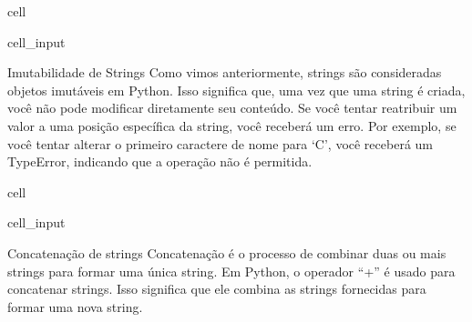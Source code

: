\documentclass[letterpaper,10pt,english]{jupyterBook}
\begin{document}
\begin{sphinxuseclass}{cell}\begin{sphinxVerbatimInput}

\begin{sphinxuseclass}{cell_input}
\begin{sphinxVerbatim}[commandchars=\\\{\}]
\PYG{p}{[}\PYG{p}{]}  
\end{sphinxVerbatim}

\end{sphinxuseclass}\end{sphinxVerbatimInput}

\end{sphinxuseclass}
\sphinxAtStartPar
Imutabilidade de Strings
Como vimos anteriormente, strings são consideradas objetos imutáveis em Python. Isso significa que, uma vez que uma string é criada, você não pode modificar diretamente seu conteúdo. Se você tentar reatribuir um valor a uma posição específica da string, você receberá um erro. Por exemplo, se você tentar alterar o primeiro caractere de nome para ‘C’, você receberá um TypeError, indicando que a operação não é permitida.

\begin{sphinxuseclass}{cell}\begin{sphinxVerbatimInput}

\begin{sphinxuseclass}{cell_input}
\begin{sphinxVerbatim}[commandchars=\\\{\}]
\PYG{p}{[}\PYG{p}{]}    
\end{sphinxVerbatim}

\end{sphinxuseclass}\end{sphinxVerbatimInput}

\end{sphinxuseclass}
\sphinxAtStartPar
Concatenação de strings
Concatenação é o processo de combinar duas ou mais strings para formar uma única string. Em Python, o operador “+” é usado para concatenar strings. Isso significa que ele combina as strings fornecidas para formar uma nova string.
\end{document}

